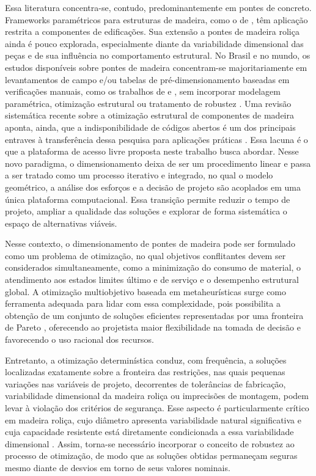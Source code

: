 Essa literatura concentra-se, contudo, predominantemente em pontes de concreto.
Frameworks paramétricos para estruturas de madeira, como o de \textcite{Jiang2023}, têm aplicação restrita a componentes de edificações.
Sua extensão a pontes de madeira roliça ainda é pouco explorada, especialmente diante da variabilidade dimensional das peças e de sua influência no comportamento estrutural.
No Brasil e no mundo, os estudos disponíveis sobre pontes de madeira concentram-se majoritariamente em levantamentos de campo e/ou tabelas de pré-dimensionamento baseadas em verificações manuais, como os trabalhos de \textcite{Criado2024} e \textcite{BERGENUDD2023115429}, sem incorporar modelagem paramétrica, otimização estrutural ou tratamento de robustez .
Uma revisão sistemática recente sobre a otimização estrutural de componentes de madeira aponta, ainda, que a indisponibilidade de códigos abertos é um dos principais entraves à transferência dessa pesquisa para aplicações práticas \parencite{Belz2025}.
Essa lacuna é o que a plataforma de acesso livre proposta neste trabalho busca abordar.
Nesse novo paradigma, o dimensionamento deixa de ser um procedimento linear e passa a ser tratado como um processo iterativo e integrado, no qual o modelo geométrico, a análise dos esforços e a decisão de projeto são acoplados em uma única plataforma computacional.
Essa transição permite reduzir o tempo de projeto, ampliar a qualidade das soluções e explorar de forma sistemática o espaço de alternativas viáveis.

Nesse contexto, o dimensionamento de pontes de madeira pode ser formulado como um problema de otimização, no qual objetivos conflitantes devem ser considerados simultaneamente, como a minimização do consumo de material, o atendimento aos estados limites último e de serviço e o desempenho estrutural global.
A otimização multiobjetivo baseada em metaheurísticas surge como ferramenta adequada para lidar com essa complexidade, pois possibilita a obtenção de um conjunto de soluções eficientes representadas por uma fronteira de Pareto \parencite{DEB2009}, oferecendo ao projetista maior flexibilidade na tomada de decisão e favorecendo o uso racional dos recursos.

Entretanto, a otimização determinística conduz, com frequência, a soluções localizadas exatamente sobre a fronteira das restrições, nas quais pequenas variações nas variáveis de projeto, decorrentes de tolerâncias de fabricação, variabilidade dimensional da madeira roliça ou imprecisões de montagem, podem levar à violação dos critérios de segurança.
Esse aspecto é particularmente crítico em madeira roliça, cujo diâmetro apresenta variabilidade natural significativa e cuja capacidade resistente está diretamente condicionada a essa variabilidade dimensional \parencite{Morgado2017}.
Assim, torna-se necessário incorporar o conceito de robustez ao processo de otimização, de modo que as soluções obtidas permaneçam seguras mesmo diante de desvios em torno de seus valores nominais.


